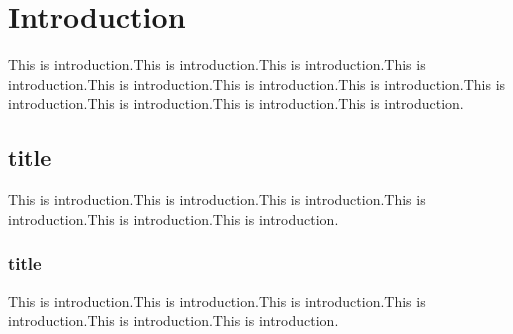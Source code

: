 \section{Introduction}
This is introduction.This is introduction.This is introduction.This is introduction.This is introduction.This is introduction.This is introduction.This is introduction.This is introduction.This is introduction.This is introduction.
\subsection{title}
This is introduction.This is introduction.This is introduction.This is introduction.This is introduction.This is introduction.\cite{redcnn}
\subsubsection{title}
This is introduction.This is introduction.This is introduction.This is introduction.This is introduction.This is introduction.